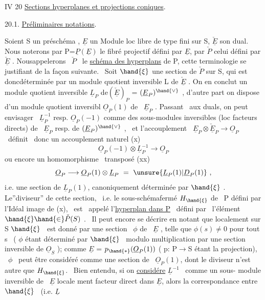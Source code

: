 IV 20 \quad \uline{Sections hyperplanes et projections coniques}.

20.1. \quad \uline{Préliminaires  notations}.

Soient S un \quad préschéma , $\underline{E}$ un Module loc libre de type fini sur S,
$\check{\underline{E}}$ son dual. Nous noterons par P=$\underline{P}(\underline{E})$ le fibré projectif défini par $\underline{E}$,
par $\check{P}$ celui défini par $\check{\underline{E}}$ . Nous\hand{|}appelerons \ $\check{P}$ \ le \uline{schéma des hyperplans}
de P, cette terminologie se justifiant de la façon suivante. \ Soit
$\hand{\xi}$ une section de $\check{P}$ sur S, qui est donc\hand{/}déterminée par un module quotient
inversible L de $\check{\underline{E}}$ . On en conclut un module quotient inversible
$\underline{L}_P$ de$(\check{\underline{E}})_P$ = $(\underline{E}_P)^{\hand{\vee}}$ , d'autre part on dispose d'un module quotient inversibl
$\underline{O}_P(1)$ de \ $\underline{E}_P$ . Passant \ aux duals, on peut envisager \ $\underline{L}_P^{-1}$ resp. $\underline{O}_P(-1)$
comme des sous-modules inversibles (loc facteurs directs) de \ $\underline{E}_P$ resp.
de $(\underline{E}_P)^{\hand{\vee}}$ , \ et l'accouplement \ $\underline{E}_P \otimes \check{\underline{E}}_P \longrightarrow \underline{O}_P$ \ définit \ donc un
accouplement naturel
(x) \[ \underline{O}_P(-1)\otimes\underline{L}_P^{-1} \to \underline{O}_P \]
ou encore un homomorphisme \ transposé
(xx) \[ \underline{O}_P \longrightarrow \underline{O}_P(1)\otimes\underline{L}_P \ = \ \unsure{\underline{L}_P(1)|\underline{D}_P(1)} \ , \]
i.e. une section de $\underline{L}_P(1)$, canoniquement déterminée par $\hand{\xi}$ . Le''diviseur''
de cette section, \ i.e. le sous-schémafermé $H_{\hand{\xi}}$ de \ P défini par l'Idéal
image de (x), \ est \ appelé l'\uline{hyperplan dans P} \ défini par \ l'élément
$\hand{\xi} \hand{\in} \check{P}(S)$ . \ Il peut encore se décrire en notant que localement sur S 
 \quad $\hand{\xi}$ \ est donné par une section \ $\phi$ de \ $\underline{E}$ ,  telle
 que $\phi(s) \neq 0$ pour tout s \ ( $\phi$ étant déterminé par $\hand{\xi}$ \ modulo
multiplication par une section inversible de $\underline{O}_S$ ); comme $\underline{E}$ = $p_{\hand{*}}(\underline{O}_P(1))$
( p: P$\to$S étant la projection), \ $\phi$ \ peut être considéré comme une section
de \ $\underline{O}_P(1)$, dont le diviseur n'est autre que $H_{\hand{\xi}}$. \ Bien entendu, si on
\uline{considére} $\underline{L}^{-1}$ \ comme un sous- module inversible de \ $\underline{E}$ locale
ment facteur direct dans $\underline{E}$, alors la correspondance entre $\hand{\xi}$ \ (i.e. $\underline{L}$ \hand{\unsure{$\xi$,}}

